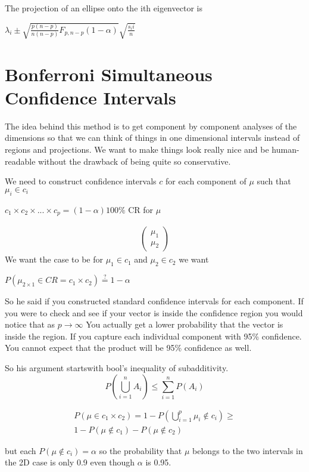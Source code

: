 The projection of an ellipse onto the ith eigenvector is 

$\lambda_i \pm \sqrt{\frac{p(n-p)}{n(n-p)}F_{p,n-p}(1-\alpha)}\sqrt{\frac{s_ii}{n}}$

\section{Bonferroni Simultaneous Confidence Intervals}

The idea behind this method is to get component by component analyses of the dimensions so that we can think of things in one dimensional intervals instead of regions and projections. We want to make things look really nice and be human-readable without the drawback of being quite so conservative.

We need to construct confidence intervals $c$ for each component of $\mu$ such that $\mu_i \in c_i$

$c_1 \times c_2 \times ... \times c_p = (1-\alpha)100\%$ CR for $\mu$

\begin{gather*}
    \begin{pmatrix}
    \mu_1 \\
    \mu_2
    \end{pmatrix}
\end{gather*}
We want the case to be for $\mu_1 \in c_1$ and $\mu_2 \in c_2$ we want 

$P(\mu_{2\times1} \in CR=c_1 \times c_2) \overset{?}{=} 1-\alpha$

So he said if you constructed standard confidence intervals for each component. If you were to check and see if your vector is inside the confidence region you would notice that as $p \rightarrow \infty$ You actually get a lower probability that the vector is inside the region.
If you capture each individual component with 95\% confidence. You cannot expect that the product will be 95\% confidence as well.

So his argument startswith bool's inequality of subadditivity.
\[P(\bigcup_{i=1}^n A_i)\leq \sum_{i=1}^nP(A_i)\]

\begin{gather*}
    P(\mu \in c_1 \times c_2) = 1-P(\bigcup_{i=1}^{p} \mu_i \not\in c_i) \geq \\
    1-P(\mu \not\in c_1)-P(\mu\not\in c_2)
\end{gather*}
 
 but each $P(\mu \not\in c_i)=\alpha$ so the probability that $\mu$ belongs to the two intervals in the 2D case is only 0.9 even though $\alpha$ is 0.95.
 
